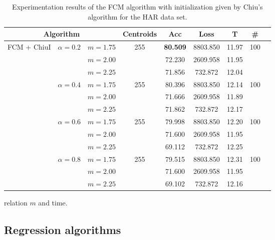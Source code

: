 \begin{table}[h!]
  \centering
\caption{Experimentation results of the FCM algorithm with initialization given by Chiu's algorithm for the HAR data set.}
\label{tab:har3}
\begin{tabular}{ccccccccc}
\hline
\multicolumn{3}{c}{Algorithm} & Centroids & Acc & Loss & T & \# \\ \hline
\multirow{12}{*}{FCM + ChiuI} & \multirow{3}{*}{$\alpha = 0.2$} & $m=1.75$ & \multirow{3}{*}{255} & \textbf{80.509} & 8803.850 & 11.97 & \multirow{3}{*}{100}\\ \
 &  & $m=2.00$ &  & 72.230 & 2609.958 & 11.95 &\\
 &  & $m=2.25$ &  & 71.856 & 732.872 & 12.04 &\\ \cline{2-8}
 & \multirow{3}{*}{$\alpha = 0.4$} & $m=1.75$ & \multirow{3}{*}{255} & 80.396 & 8803.850 & 12.14 &\multirow{3}{*}{100}\\
 &  & $m=2.00$ &  & 71.666 & 2609.958 & 11.89 &\\
 &  & $m=2.25$ &  & 71.862 & 732.872 & 12.17 & \\ \cline{2-8}
 & \multirow{3}{*}{$\alpha = 0.6$} & $m=1.75$ & \multirow{3}{*}{255} & 79.998 & 8803.850 & 12.20 &\multirow{3}{*}{100}\\
 &  & $m=2.00$ &  & 71.600 & 2609.958 & 11.95 &\\
 &  & $m=2.25$ &  & 69.112 & 732.872 & 12.25 &\\ \cline{2-8}
 & \multirow{3}{*}{$\alpha = 0.8$} & $m=1.75$ & \multirow{3}{*}{255} & 79.515 & 8803.850 & 12.31 &\multirow{3}{*}{100}\\
 &  & $m=2.00$ &  & 71.600 & 2609.958 & 11.95 &\\
 &  & $m=2.25$ &  & 69.102 & 732.872 & 12.16 &\\ \hline
\end{tabular}
\end{table}

relation $m$ and time.
\subsection{Regression algorithms}
